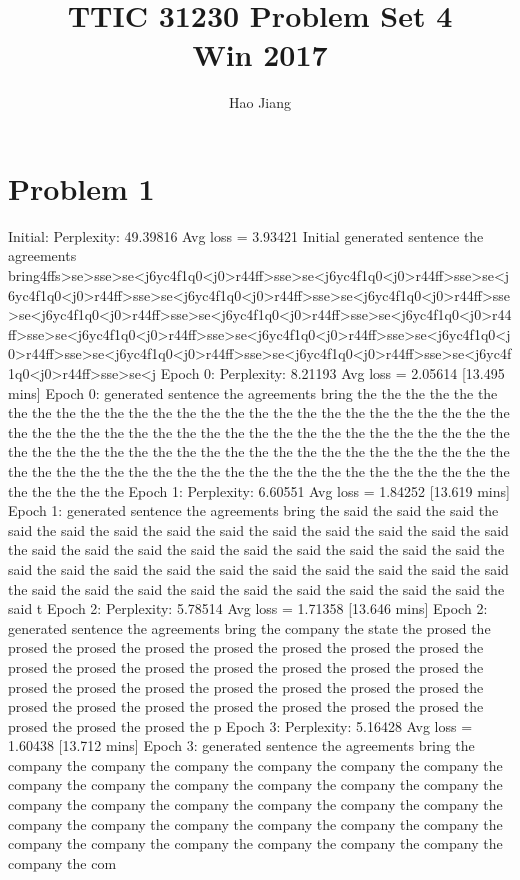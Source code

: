 \documentclass{article}
\title{TTIC 31230 Problem Set 4 \\ Win 2017}
\author{Hao Jiang}
\begin{document}
\maketitle

\section*{Problem 1}

Initial: Perplexity: 49.39816 Avg loss = 3.93421
Initial generated sentence 
the agreements bring4ffs>se>sse>se<j6yc4f1q0<j0>r44ff>sse>se<j6yc4f1q0<j0>r44ff>sse>se<j6yc4f1q0<j0>r44ff>sse>se<j6yc4f1q0<j0>r44ff>sse>se<j6yc4f1q0<j0>r44ff>sse>se<j6yc4f1q0<j0>r44ff>sse>se<j6yc4f1q0<j0>r44ff>sse>se<j6yc4f1q0<j0>r44ff>sse>se<j6yc4f1q0<j0>r44ff>sse>se<j6yc4f1q0<j0>r44ff>sse>se<j6yc4f1q0<j0>r44ff>sse>se<j6yc4f1q0<j0>r44ff>sse>se<j6yc4f1q0<j0>r44ff>sse>se<j6yc4f1q0<j0>r44ff>sse>se<j
Epoch 0: Perplexity: 8.21193 Avg loss = 2.05614 [13.495 mins]
Epoch 0: generated sentence 
the agreements bring the the the the the the the the the the the the the the the the the the the the the the the the the the the the the the the the the the the the the the the the the the the the the the the the the the the the the the the the the the the the the the the the the the the the the the the the the the the the the the the the the the the the the the the the the the the the the the the
Epoch 1: Perplexity: 6.60551 Avg loss = 1.84252 [13.619 mins]
Epoch 1: generated sentence 
the agreements bring the said the said the said the said the said the said the said the said the said the said the said the said the said the said the said the said the said the said the said the said the said the said the said the said the said the said the said the said the said the said the said the said the said the said the said the said the said the said the said the said the said the said t
Epoch 2: Perplexity: 5.78514 Avg loss = 1.71358 [13.646 mins]
Epoch 2: generated sentence 
the agreements bring the company the state the prosed the prosed the prosed the prosed the prosed the prosed the prosed the prosed the prosed the prosed the prosed the prosed the prosed the prosed the prosed the prosed the prosed the prosed the prosed the prosed the prosed the prosed the prosed the prosed the prosed the prosed the prosed the prosed the prosed the prosed the prosed the prosed the p
Epoch 3: Perplexity: 5.16428 Avg loss = 1.60438 [13.712 mins]
Epoch 3: generated sentence 
the agreements bring the company the company the company the company the company the company the company the company the company the company the company the company the company the company the company the company the company the company the company the company the company the company the company the company the company the company the company the company the company the company the company the com
\end{document}
